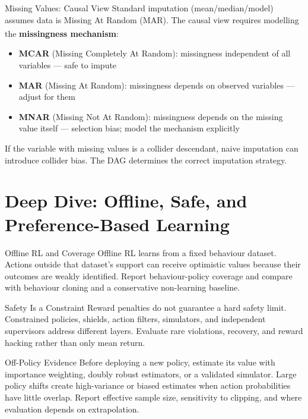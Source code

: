 \begin{v3topic}{Missing Values: Causal View}
    Standard imputation (mean/median/model) assumes data is Missing At
    Random (MAR). The causal view requires modelling the
    \textbf{missingness mechanism}:\textsuperscript{\cite[][Ch.~8]{nessCausalAI2025}}

    \begin{itemize}
        \item \textbf{MCAR} (Missing Completely At Random): missingness
              independent of all variables --- safe to impute
        \item \textbf{MAR} (Missing At Random): missingness depends on
              observed variables --- adjust for them
        \item \textbf{MNAR} (Missing Not At Random): missingness depends
              on the missing value itself --- selection bias; model the
              mechanism explicitly
    \end{itemize}

    If the variable with missing values is a collider descendant, naive
    imputation can introduce collider bias. The DAG determines the
    correct imputation strategy.

\end{v3topic}

\section{Deep Dive: Offline, Safe, and Preference-Based Learning}
\begin{v3topic}{Offline RL and Coverage}
Offline RL learns from a fixed behaviour dataset.
Actions outside that dataset's support can receive optimistic values because
their outcomes are weakly identified.
Report behaviour-policy coverage and compare with behaviour cloning and a
conservative non-learning baseline.

\end{v3topic}
\begin{v3topic}{Safety Is a Constraint}
Reward penalties do not guarantee a hard safety limit.
Constrained policies, shields, action filters, simulators, and independent
supervisors address different layers.
Evaluate rare violations, recovery, and reward hacking rather than only mean
return.

\end{v3topic}
\begin{v3topic}{Off-Policy Evidence}
Before deploying a new policy, estimate its value with importance weighting,
doubly robust estimators, or a validated simulator.
Large policy shifts create high-variance or biased estimates when action
probabilities have little overlap.
Report effective sample size, sensitivity to clipping, and where evaluation
depends on extrapolation.
\end{v3topic}


